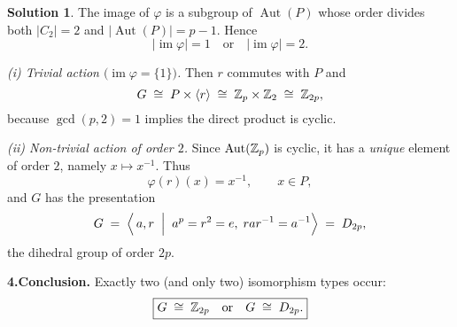 \documentclass[12pt]{article}
\DeclareMathOperator{\Aut}{Aut}
\theoremstyle{definition} %
\newtheorem{solution}{Solution}
\theoremstyle{plain} %
\begin{document}
\begin{solution}
                  The image of $\varphi$ is a subgroup of $\Aut(P)$ whose order divides
                  both $\lvert C_{2}\rvert=2$ and $\lvert\Aut(P)\rvert=p-1$.
                  Hence
                  \[
                     \lvert\operatorname{im}\varphi\rvert = 1
                     \quad\text{or}\quad
                     \lvert\operatorname{im}\varphi\rvert = 2.
                  \]
                  
                  \smallskip
                  \emph{(i) Trivial action $\bigl(\operatorname{im}\varphi=\{1\}\bigr)$.}\;
                  Then $r$ commutes with $P$ and
                  \[
                     G \;\cong\; P\times\langle r\rangle
                               \;\cong\; \Bbb Z_{p}\times\Bbb Z_{2}
                               \;\cong\; \Bbb Z_{2p},
                  \]
                  because $\gcd(p,2)=1$ implies the direct product is cyclic.
                  
                  \smallskip
                  \emph{(ii) Non-trivial action of order $2$.}\;
                  Since $\Aut(\Bbb Z_{p})$ is cyclic, it has a \emph{unique} element of
                  order $2$, namely $x\mapsto x^{-1}$.  
                  Thus
                  \[
                     \varphi(r)(x)=x^{-1},\qquad x\in P,
                  \]
                  and $G$ has the presentation
                  \[
                     G
                       \;=\;
                     \Bigl\langle\,a,r\;\Bigm|\;
                                a^{p}=r^{2}=e,\; rar^{-1}=a^{-1}\Bigr\rangle
                       \;=\; D_{2p},
                  \]
                  the dihedral group of order $2p$.
                  
                  \bigskip
                  \textbf{4.\;Conclusion.}
                  Exactly two (and only two) isomorphism types occur:
                  \[
                     \boxed{%
                        G\;\cong\;\Bbb Z_{2p}
                        \quad\text{or}\quad
                        G\;\cong\;D_{2p}.}
                  \]
                  \end{solution}
\end{document}
